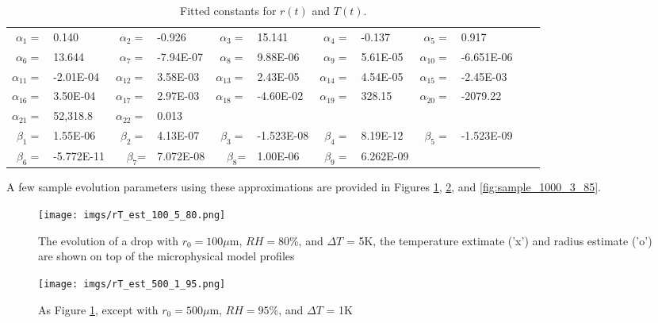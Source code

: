 \documentclass[10pt,a4paper]{article}
\begin{document}
\begin{table}[!h]
\centering
\hspace*{-0.25in}\begin{tabular}{rlrlrlrlrlrl}
$\alpha_{1}=$ & 0.140 & $\alpha_{2}=$ & -0.926 & $\alpha_{3}=$ & 15.141 & $\alpha_{4}=$ & -0.137 & $\alpha_{5}=$ & 0.917 &  \\
$\alpha_{6}=$ & 13.644  & $\alpha_{7}=$ & -7.94E-07  & $\alpha_{8}=$ & 9.88E-06 & $\alpha_{9}=$ &  5.61E-05& $\alpha_{10}=$ & -6.651E-06 & \\
  $\alpha_{11}=$  & -2.01E-04 & $\alpha_{12}=$ & 3.58E-03 & $\alpha_{13}=$ & 2.43E-05  & $\alpha_{14}=$ & 4.54E-05 & $\alpha_{15}=$ &  -2.45E-03 & \\
$\alpha_{16}=$ & 3.50E-04&   $\alpha_{17}=$  & 2.97E-03& $\alpha_{18}=$ & -4.60E-02 & $\alpha_{19}=$ & 328.15 & $\alpha_{20}=$ & -2079.22 & \\
$\alpha_{21}=$ &  52,318.8 & $\alpha_{22}=$ &0.013&   & & & \\
 $\beta_{1}=$ & 1.55E-06 & $\beta_{2}=$ & 4.13E-07 & $\beta_{3}=$ & -1.523E-08 & $\beta_{4}=$& 8.19E-12 & $\beta_5=$ & -1.523E-09 \\
 $\beta_6=$ &-5.772E-11 & $\beta_7$= & 7.072E-08 & $\beta_8$= & 1.00E-06 & $\beta_9=$ &6.262E-09\\
\end{tabular}
\caption{Fitted constants for $r(t)$ and $T(t)$. \label{tab:coeffs}}
\end{table}

A few sample evolution parameters using these approximations are provided in Figures \ref{fig:sample_100_5_80}, \ref{fig:sample_500_1_95}, and \ref{fig:sample_1000_3_85}.

\begin{figure}[h!]
    \centering
        \texttt{[image: imgs/rT\_est\_100\_5\_80.png]}        
       \caption{ The evolution of a drop with $r_0 = 100\mu$m, $RH = 80$\%, and $\Delta T$ = 5K, the temperature extimate ('x') and radius estimate ('o') are shown on top of the microphysical model profiles} 
       \label{fig:sample_100_5_80}
\end{figure}
\begin{figure}[h!]
    \centering
        \texttt{[image: imgs/rT\_est\_500\_1\_95.png]}        
       \caption{As Figure \ref{fig:sample_100_5_80}, except with $r_0 = 500\mu$m, $RH = 95$\%, and $\Delta T$ = 1K } 
       \label{fig:sample_500_1_95}
\end{figure}
\end{document}
